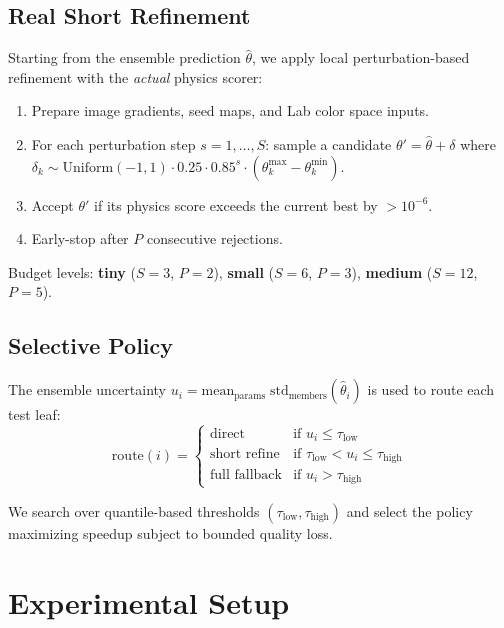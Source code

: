 \documentclass[11pt,a4paper]{article}
\begin{document}
\subsection{Real Short Refinement}
Starting from the ensemble prediction $\hat{\theta}$, we apply
local perturbation-based refinement with the \emph{actual} physics scorer:
\begin{enumerate}
\item Prepare image gradients, seed maps, and Lab color space inputs.
\item For each perturbation step $s = 1, \ldots, S$:
  sample a candidate $\theta' = \hat{\theta} + \delta$ where
  $\delta_k \sim \text{Uniform}(-1,1) \cdot 0.25 \cdot 0.85^s \cdot (\theta_k^\text{max} - \theta_k^\text{min})$.
\item Accept $\theta'$ if its physics score exceeds the current best by $>10^{-6}$.
\item Early-stop after $P$ consecutive rejections.
\end{enumerate}

Budget levels: \textbf{tiny} ($S{=}3$, $P{=}2$),
\textbf{small} ($S{=}6$, $P{=}3$),
\textbf{medium} ($S{=}12$, $P{=}5$).

\subsection{Selective Policy}
The ensemble uncertainty $u_i = \text{mean}_\text{params}\;\text{std}_\text{members}(\hat{\theta}_i)$
is used to route each test leaf:
\begin{equation}
\text{route}(i) = \begin{cases}
\text{direct} & \text{if } u_i \leq \tau_\text{low} \\
\text{short refine} & \text{if } \tau_\text{low} < u_i \leq \tau_\text{high} \\
\text{full fallback} & \text{if } u_i > \tau_\text{high}
\end{cases}
\end{equation}

We search over quantile-based thresholds $(\tau_\text{low}, \tau_\text{high})$
and select the policy maximizing speedup subject to bounded quality loss.

\section{Experimental Setup}
\label{sec:experiments}
\end{document}
